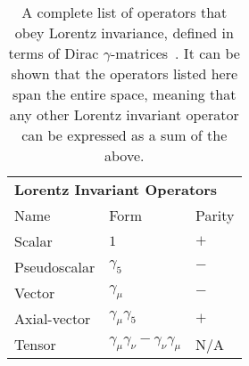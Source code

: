 %
%
%
\begin{table}[h!!!!t]
	\begin{center}
	\begin{tabular}{ l  l  l}
		\multicolumn{3}{l}{ \textbf{Lorentz Invariant Operators}}
		\\  %
		\multicolumn{1}{l}{Name} 		& \multicolumn{1}{l}{ Form}   								& \multicolumn{1}{l}{Parity}   	
		\\  \hline
		Scalar 			   				& $1$														& $+$									
		\\
		Pseudoscalar \;\;\;\;\;\;\;		& $\gamma_5$									 			& $-$				
		\\
		Vector							& $\gamma_\mu$												& $-$				
		\\
		Axial-vector					& $\gamma_\mu \gamma_5$										& $+$
		\\
		Tensor							& $\gamma_\mu \gamma_\nu - \gamma_\nu \gamma_\mu$ \;\;		& N/A									
		\\  \hline
	\end{tabular}
	\end{center}
	\caption[Lorentz Invariant Operators]{A complete list of operators that obey Lorentz invariance, defined in terms of Dirac $\gamma$-matrices~\cite{ben_thesis,dan_thesis}.  It can be shown that the operators listed here span the entire space, meaning that any other Lorentz invariant operator can be expressed as a sum of the above. }
	\label{table:dirac_matrix_operators}
\end{table}
